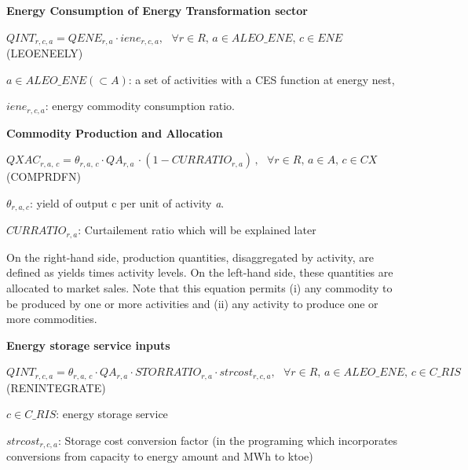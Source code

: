 \documentclass[10pt,a4paper,titlepage,dvipdfmx]{book}
\begin{document}
\begin{flushleft}\textbf{Energy Consumption of Energy Transformation sector}\end{flushleft}


\begin{center}$QINT_{r,c,a}=QENE_{r,a}\cdot iene_{r,c,a},\,\,\,\,\forall r\in R,\,a\in ALEO\_ ENE,\,c\in ENE$ (LEOENEELY)
\end{center}

$a\in ALEO\_ ENE\left(\subset A\right)$: a set of activities with a CES function at energy nest,

\begin{flushleft}
$iene_{r,c,a}$: energy commodity consumption ratio.
\end{flushleft}

\begin{flushleft}\textbf{Commodity Production and Allocation}\end{flushleft}


\begin{center}$QXAC_{r,a,\,c}=\theta _{r,a,\,c}\cdot QA_{r,a}\,\cdot \left(1-CURRATIO_{r,a}\right)\,,\,\,\,\,\forall r\in R,\,a\in A,\,c\in CX$ (COMPRDFN)
\end{center}

\begin{flushleft}
${\theta}_{r,a,c}$: yield of output c per unit of activity \textit{a}.

$CURRATIO_{r,a}$: Curtailement ratio which will be explained later
\end{flushleft}

On the right-hand side, production quantities, disaggregated by activity, are defined as yields times activity levels. On the left-hand side, these quantities are allocated to market sales. Note that this equation permits (i) any commodity to be produced by one or more activities and (ii) any activity to produce one or more commodities.

\begin{flushleft}\textbf{Energy storage service inputs }\end{flushleft}


\begin{center}$QINT_{r,c,a}=\theta _{r,a,\,c}\cdot QA_{r,a}\cdot STORRATIO_{r,a}\cdot strcost_{r,c,a},\,\,\,\,\forall r\in R,\,a\in ALEO\_ ENE,\,c\in C\_ RIS$ (RENINTEGRATE)
\end{center}

\begin{flushleft}
$c\in C\_ RIS$: energy storage service

$strcost_{r,c,a}$: Storage cost conversion factor (in the programing which incorporates conversions from capacity to energy amount and MWh to ktoe)
\end{flushleft}
\end{document}
